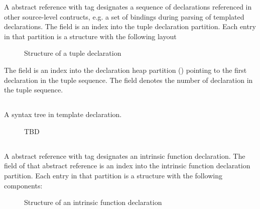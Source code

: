A  abstract reference with tag  designates a sequence
of declarations referenced in other source-level contructs, e.g. a set of bindings during 
parsing of templated declarations.  The  field is an index into the
tuple declaration partition.  Each entry in that partition is a structure with the following
layout
%
\begin{figure}[H]
	\centering
	\caption{Structure of a tuple declaration}
	\label{fig:ifc-tuple-declaration-structure}
\end{figure}
%
The  field is an index into the declaration heap 
partition () pointing to the first declaration in 
the tuple sequence.  The  field
denotes the number of declaration in the tuple sequence.




\subsection{}
\label{sec:ifc:DeclSort:SyntaxTree}

A syntax tree in template declaration.
\begin{figure}[H]
	\centering
	TBD
\end{figure}




\subsection{} 
\label{sec:ifc:DeclSort:Intrinsic}

A  abstract reference with tag  designates an intrinsic function declaration.
The  field of that abstract reference is an index into the intrinsic function declaration partition.
Each entry in that partition is a structure with the following components:
%
\begin{figure}[H]
	\centering
	\caption{Structure of an intrinsic function declaration}
	\label{fig:ifc-intrinsic-decl-structure}
\end{figure}
%

